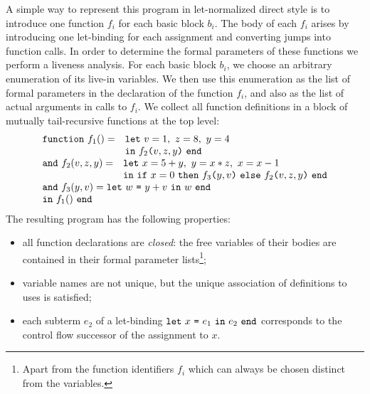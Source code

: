 A simple way to represent this program in let-normalized direct style
is to introduce one function $f_i$ for each basic block $b_i$. The
body of each $f_i$ arises by introducing one let-binding for each
assignment and converting jumps into function calls. In order to
determine the formal parameters of these functions we perform a
liveness analysis. For each basic block $b_i$, we choose an arbitrary
enumeration of its live-in variables. We then use this enumeration as
the list of formal parameters in the declaration of the function
$f_i$, and also as the list of actual arguments in calls to $f_i$. We
collect all function definitions in a block of mutually tail-recursive
functions at the top level:
\begin{equation}
\label{FunctionalConstructionProgram1}
\begin{array}{l}
  \begin{array}{ll}
    \texttt{function}\ f_1() = 
     & \texttt{let}\ v = 1,\ z = 8,\ y = 4\\
     & \texttt{in}\ {f_2}\texttt{(}{v,z,y}\texttt{)}\ \texttt{end}
  \end{array}\\
  \begin{array}{ll}
    \texttt{and}\ f_2(v,z,y) =
     & \texttt{let}\ x = {5+y},\ y = {x*z},\ x = {x-1}\\
     & \texttt{in}\ {\texttt{if}\ {x=0}\ \texttt{then}\ {{f_3}\texttt{(}{y,v}\texttt{)}}\ \texttt{else}\ {{f_2}\texttt{(}{v,z,y}\texttt{)}}}\
       \texttt{end}
  \end{array}\\
  \begin{array}{l}
    \texttt{and}\ f_3(y,v) = \texttt{let}\ {w}\ \texttt{=}\ {y+v}\ \texttt{in}\ {w}\ \texttt{end}\\
    \texttt{in}\ f_1()\ \texttt{end}
  \end{array} 
\end{array}
\end{equation}
The resulting program has the following properties:
\begin{itemize}
\item 
  all function declarations are \emph{closed}: the free variables of
  their bodies are contained in their formal parameter
  lists\footnote{Apart from the function identifiers $f_i$ which can
  always be chosen distinct from the variables.};

\item
  variable names are not unique, but the unique association of
  definitions to uses is satisfied;

\item
  each subterm $e_2$ of a let-binding $\texttt{let}\ {x}\ \texttt{=}\ {e_1}\ \texttt{in}\ {e_2}\ \texttt{end}$
  corresponds to the control flow successor of the assignment to $x$.

\end{itemize}

